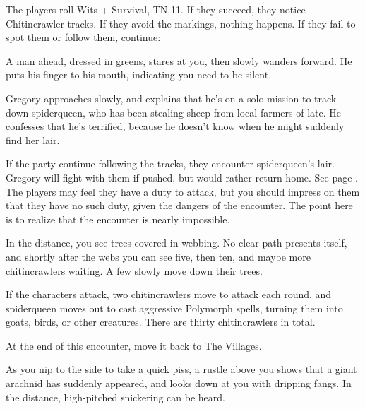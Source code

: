 \begin{multicols}{2}
The players roll Wits + Survival, TN 11.  If they succeed, they notice Chitincrawler tracks.  If they avoid the markings, nothing happens.  If they fail to spot them or follow them, continue:

\begin{boxtext}

	A man ahead, dressed in greens, stares at you, then slowly wanders forward.  He puts his finger to his mouth, indicating you need to be silent.

\end{boxtext}

Gregory approaches slowly, and explains that he's on a solo mission to track down \gls{spiderqueen}, who has been stealing sheep from local farmers of late.  He confesses that he's terrified, because he doesn't know when he might suddenly find her lair.

If the party continue following the tracks, they encounter \gls{spiderqueen}'s lair.  Gregory will fight with them if pushed, but would rather return home.  See page \pageref{spiderqueen}.  The players may feel they have a duty to attack, but you should impress on them that they have no such duty, given the dangers of the encounter.  The point here is to realize that the encounter is nearly impossible.

\begin{boxtext}
	In the distance, you see trees covered in webbing.  No clear path presents itself, and shortly after the webs you can see five, then ten, and maybe more chitincrawlers waiting.  A few slowly move down their trees.
\end{boxtext}

If the characters attack, two chitincrawlers move to attack each round, and \gls{spiderqueen} moves out to cast aggressive Polymorph spells, turning them into goats, birds, or other creatures.
There are thirty chitincrawlers in total.

At the end of this encounter, move it back to The Villages.


\humansoldier


\begin{boxtext}

	As you nip to the side to take a quick piss, a rustle above you shows that a giant arachnid has suddenly appeared, and looks down at you with dripping fangs.  In the distance, high-pitched snickering can be heard.


\end{boxtext}
\end{multicols}

